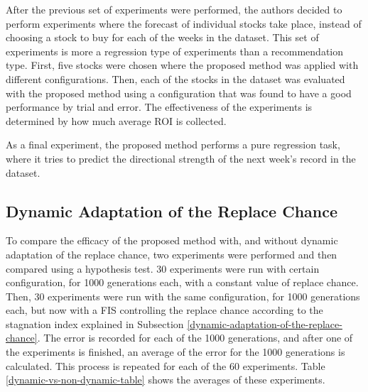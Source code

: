 \documentclass[12pt,journal,compsoc]{IEEEtran}
\begin{document}
After the previous set of experiments were performed, the authors decided to perform experiments where the forecast of individual stocks take place, instead of choosing a stock to buy for each of the weeks in the dataset. This set of experiments is more a regression type of experiments than a recommendation type. First, five stocks were chosen where the proposed method was applied with different configurations. Then, each of the stocks in the dataset was evaluated with the proposed method using a configuration that was found to have a good performance by trial and error. The effectiveness of the experiments is determined by how much average ROI is collected.

As a final experiment, the proposed method performs a pure regression task, where it tries to predict the directional strength of the next week's record in the dataset.

\subsection{Dynamic Adaptation of the Replace Chance}

To compare the efficacy of the proposed method with, and without dynamic adaptation of the replace chance, two experiments were performed and then compared using a hypothesis test. 30 experiments were run with certain configuration, for 1000 generations each, with a constant value of replace chance. Then, 30 experiments were run with the same configuration, for 1000 generations each, but now with a FIS controlling the replace chance according to the stagnation index explained in Subsection \ref{dynamic-adaptation-of-the-replace-chance}. The error is recorded for each of the 1000 generations, and after one of the experiments is finished, an average of the error for the 1000 generations is calculated. This process is repeated for each of the 60 experiments. Table \ref{dynamic-vs-non-dynamic-table} shows the averages of these experiments.
\end{document}
